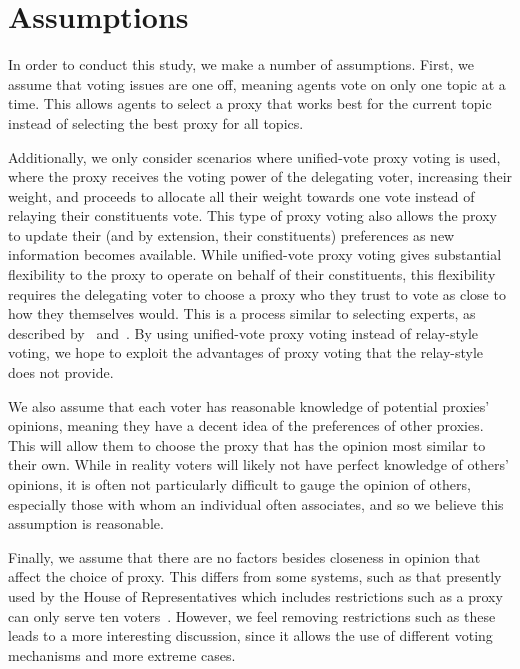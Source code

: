 \section{Assumptions}\label{sec:assumptions}
In order to conduct this study, we make a number of assumptions.
First, we assume that voting issues are one off, meaning agents vote on only one
topic at a time.
This allows agents to select a proxy that works best for the current topic instead of
selecting the best proxy for all topics.

Additionally, we only consider scenarios where unified-vote proxy voting is used, where
the proxy receives the voting power of the delegating voter, increasing their weight,
and proceeds to allocate all their weight towards one vote instead of relaying their
constituents vote.
This type of proxy voting also allows the proxy to update their (and by extension, their
constituents) preferences as new information becomes available.
While unified-vote proxy voting gives substantial flexibility to the proxy to operate
on behalf of their constituents, this flexibility requires the delegating voter to
choose a proxy who they trust to vote as close to how they themselves would.
This is a process similar to selecting experts, as described by~\cite{Miller1969}
and~\cite{Mueller1972}.
By using unified-vote proxy voting instead of relay-style voting, we hope to exploit
the advantages of proxy voting that the relay-style does not provide.

We also assume that each voter has reasonable knowledge of potential proxies'
opinions, meaning they have a decent idea of the preferences of other proxies.
This will allow them to choose the proxy that has the opinion most similar to their own.
While in reality voters will likely not have perfect knowledge of others' opinions,
it is often not particularly difficult to gauge the opinion of others, especially
those with whom an individual often associates, and so we believe this assumption is
reasonable.

Finally, we assume that there are no factors besides closeness in opinion that affect
the choice of proxy.
This differs from some systems, such as that presently used by the House of
Representatives which includes restrictions such as a proxy can only serve ten
voters~\cite{CERP2020}.
However, we feel removing restrictions such as these leads to a more interesting
discussion, since it allows the use of different voting mechanisms and more extreme
cases.

